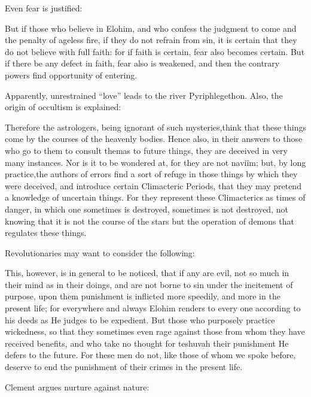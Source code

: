 Even fear is justified:

\begin{quotex}
But if those who believe in Elohim, and who confess the judgment to come and the penalty of ageless fire, if they do not refrain from sin, it is certain that they do not believe with full faith: for if faith is certain, fear also becomes certain. But if there be any defect in faith, fear also is weakened, and then the contrary powers find opportunity of entering.
\end{quotex}


Apparently, unrestrained ``love'' leads to the river Pyriphlegethon. Also, the origin of occultism is explained:

\begin{quotex}
Therefore the astrologers, being ignorant of such mysteries,think that these things come by the courses of the heavenly bodies. Hence also, in their answers to those who go to them to consult themas to future things, they are deceived in very many instances. Nor is it to be wondered at, for they are not naviïm; but, by long practice,the authors of errors find a sort of refuge in those things by which they were deceived, and introduce certain Climacteric Periods, that they may pretend a knowledge of uncertain things. For they represent these Climacterics as times of danger, in which one sometimes is destroyed, sometimes is not destroyed, not knowing that it is not the course of the stars but the operation of demons that regulates these things.
\end{quotex}


Revolutionaries may want to consider the following:

\begin{quotex}
This, however, is in general to be noticed, that if any are evil, not so much in their mind as in their doings, and are not borne to sin under the incitement of purpose, upon them punishment is inflicted more speedily, and more in the present life; for everywhere and always Elohim renders to every one according to his deeds as He judges to be expedient. But those who purposely practice wickedness, so that they sometimes even rage against those from whom they have received benefits, and who take no thought for teshuvah their punishment He defers to the future. For these men do not, like those of whom we spoke before, deserve to end the punishment of their crimes in the present life.
\end{quotex}


Clement argues nurture against nature:

